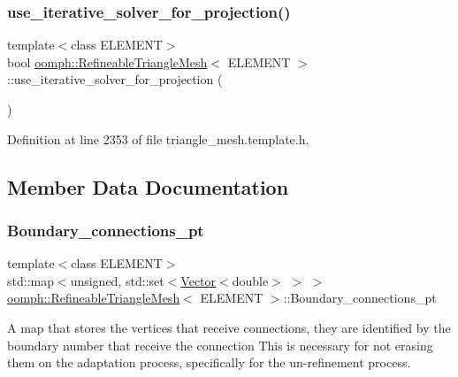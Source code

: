 \subsubsection{\texorpdfstring{use\+\_\+iterative\+\_\+solver\+\_\+for\+\_\+projection()}{use\_iterative\_solver\_for\_projection()}}
{\footnotesize\ttfamily template$<$class E\+L\+E\+M\+E\+NT$>$ \\
bool \hyperlink{classoomph_1_1RefineableTriangleMesh}{oomph\+::\+Refineable\+Triangle\+Mesh}$<$ E\+L\+E\+M\+E\+NT $>$\+::use\+\_\+iterative\+\_\+solver\+\_\+for\+\_\+projection (\begin{DoxyParamCaption}{ }\end{DoxyParamCaption})\hspace{0.3cm}{\ttfamily [inline]}}



Definition at line 2353 of file triangle\+\_\+mesh.\+template.\+h.



\subsection{Member Data Documentation}
\mbox{\label{classoomph_1_1RefineableTriangleMesh_a099ddd14a05c116188ecc3d6ec2f68d1}} 
\subsubsection{\texorpdfstring{Boundary\+\_\+connections\+\_\+pt}{Boundary\_connections\_pt}}
{\footnotesize\ttfamily template$<$class E\+L\+E\+M\+E\+NT$>$ \\
std\+::map$<$unsigned, std\+::set$<$\hyperlink{classoomph_1_1Vector}{Vector}$<$double$>$ $>$ $>$ \hyperlink{classoomph_1_1RefineableTriangleMesh}{oomph\+::\+Refineable\+Triangle\+Mesh}$<$ E\+L\+E\+M\+E\+NT $>$\+::Boundary\+\_\+connections\+\_\+pt\hspace{0.3cm}{\ttfamily [protected]}}



A map that stores the vertices that receive connections, they are identified by the boundary number that receive the connection This is necessary for not erasing them on the adaptation process, specifically for the un-\/refinement process. 



